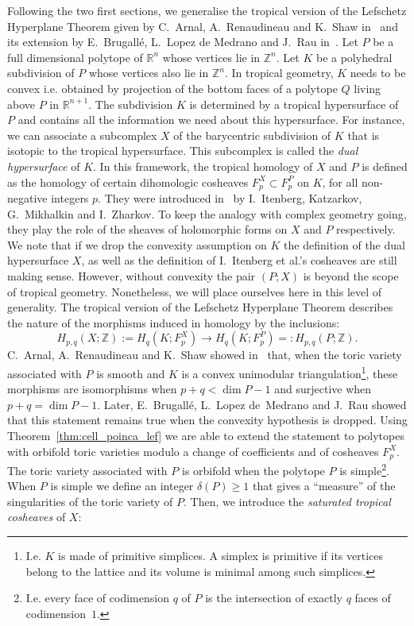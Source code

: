 \documentclass[AHL,Unicode,longabstracts,published]{cedram}
\newcommand{\R}{\mathbb{R}}
\newcommand{\Z}{\mathbb{Z}}
\begin{document}
Following the two first sections, we generalise the tropical version of the Lefschetz Hyperplane Theorem given by C.~Arnal, A.~Renaudineau and K.~Shaw in~\cite[Theorem~1.2.1349]{Arn-Ren-Sha_Lef_sec} and its extension by E.~Brugallé, L.~Lopez de Medrano and J.~Rau in~\cite[Proposition~3.2 p.~15]{Brug-LdM-Rau_Comb_pac}. Let $P$ be a full dimensional polytope of $\R^n$ whose vertices lie in $\Z^n$. Let $K$ be a polyhedral subdivision of $P$ whose vertices also lie in $\Z^n$. In tropical geometry, $K$ needs to be convex i.e. obtained by projection of the bottom faces of a polytope $Q$ living above $P$ in $\R^{n+1}$. The subdivision $K$ is determined by a tropical hypersurface of $P$ and contains all the information we need about this hypersurface. For instance, we can associate a subcomplex $X$ of the barycentric subdivision of $K$ that is isotopic to the tropical hypersurface. This subcomplex is called the \emph{dual hypersurface} of $K$. In this framework, the tropical homology of $X$ and $P$ is defined as the homology of certain dihomologic cosheaves $F^{X}_p\subset F^{P}_p$ on $K$, for all non-negative integers $p$. They were introduced in~\cite{Ite-Kat-Mik-Zha_tro_hom} by I.~Itenberg, Katzarkov, G.~Mikhalkin and I.~Zharkov. To keep the analogy with complex geometry going, they play the role of the sheaves of holomorphic forms on $X$ and $P$ respectively. We note that if we drop the convexity assumption on $K$ the definition of the dual hypersurface $X$, as well as the definition of I.~Itenberg et al.'s cosheaves are still making sense. However, without convexity the pair $(P;X)$ is beyond the scope of tropical geometry. Nonetheless, we will place ourselves here in this level of generality. The tropical version of the Lefschetz Hyperplane Theorem describes the nature of the morphisms induced in homology by the inclusions:
\begin{equation*}
H_{p,q}(X;\Z):=H_q\left(K;F^{X}_p\right)\rightarrow H_q\left(K; F^{P}_p\right)=:H_{p,q}(P;\Z).
\end{equation*}
C.~Arnal, A.~Renaudineau and K.~Shaw showed in~\cite{Arn-Ren-Sha_Lef_sec} that, when the toric variety associated with $P$ is smooth and $K$ is a convex unimodular triangulation\footnote{I.e. $K$ is made of primitive simplices. A simplex is primitive if its vertices belong to the lattice and its volume is minimal among such simplices.}, these morphisms are isomorphisms when $p+q<\dim P -1$ and surjective when $p+q=\dim P -1$. Later, E.~Brugallé, L.~Lopez de~Medrano and J.~Rau showed that this statement remains true when the convexity hypothesis is dropped. Using Theorem~\ref{thm:cell_poinca_lef} we are able to extend the statement to polytopes with orbifold toric varieties modulo a change of coefficients and of cosheaves $F^X_p$. The toric variety associated with $P$ is orbifold when the polytope $P$ is simple\footnote{I.e. every face of codimension $q$ of $P$ is the intersection of exactly $q$ faces of codimension~$1$.}. When $P$ is simple we define an integer $\delta(P)\geq 1$ that gives a ``measure'' of the singularities of the toric variety of $P$. Then, we introduce the \emph{saturated tropical cosheaves} of $X$:
\end{document}
